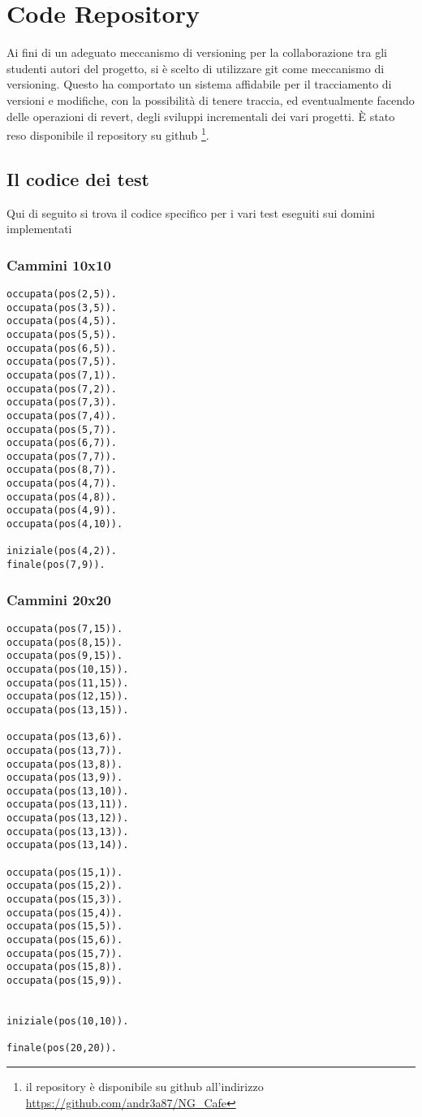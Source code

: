 \appendix
\chapter{Code Repository}

Ai fini di un adeguato meccanismo di versioning per la collaborazione tra gli studenti autori del progetto, si è scelto di utilizzare git come meccanismo di versioning.
Questo ha comportato un sistema affidabile per il tracciamento di versioni e modifiche, con la possibilità di tenere traccia, ed eventualmente facendo delle operazioni di revert, degli sviluppi incrementali dei vari progetti.
È stato reso disponibile il repository su github \footnote{il repository è disponibile su github all'indirizzo \url{https://github.com/andr3a87/NG_Cafe} }.	

\section{Il codice dei test}
Qui di seguito si trova il codice specifico per i vari test eseguiti sui domini implementati

\subsection{Cammini 10x10}

\begin{lstlisting}
occupata(pos(2,5)).
occupata(pos(3,5)).
occupata(pos(4,5)).
occupata(pos(5,5)).
occupata(pos(6,5)).
occupata(pos(7,5)).
occupata(pos(7,1)).
occupata(pos(7,2)).
occupata(pos(7,3)).
occupata(pos(7,4)).
occupata(pos(5,7)).
occupata(pos(6,7)).
occupata(pos(7,7)).
occupata(pos(8,7)).
occupata(pos(4,7)).
occupata(pos(4,8)).
occupata(pos(4,9)).
occupata(pos(4,10)).

iniziale(pos(4,2)).
finale(pos(7,9)).
\end{lstlisting}

\subsection{Cammini 20x20}

\begin{lstlisting}
occupata(pos(7,15)).
occupata(pos(8,15)).
occupata(pos(9,15)).
occupata(pos(10,15)).
occupata(pos(11,15)).
occupata(pos(12,15)).
occupata(pos(13,15)).

occupata(pos(13,6)).
occupata(pos(13,7)).
occupata(pos(13,8)).
occupata(pos(13,9)).
occupata(pos(13,10)).
occupata(pos(13,11)).
occupata(pos(13,12)).
occupata(pos(13,13)).
occupata(pos(13,14)).

occupata(pos(15,1)).
occupata(pos(15,2)).
occupata(pos(15,3)).
occupata(pos(15,4)).
occupata(pos(15,5)).
occupata(pos(15,6)).
occupata(pos(15,7)).
occupata(pos(15,8)).
occupata(pos(15,9)).


iniziale(pos(10,10)).

finale(pos(20,20)).
\end{lstlisting}

